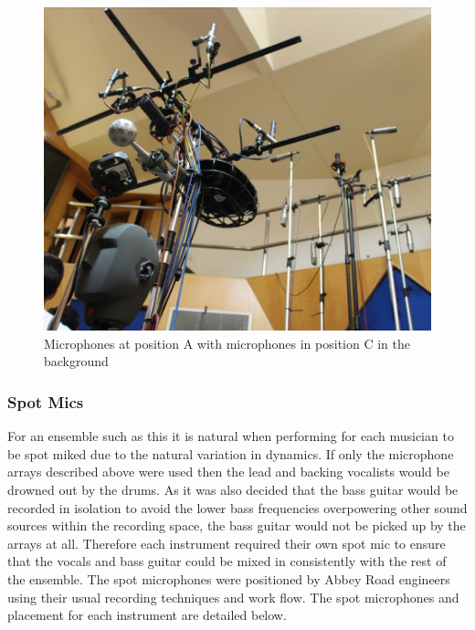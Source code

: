 			\begin{figure}[h]
			\begin{center}
				\includegraphics[width =\linewidth]{images/other/posAC.png}
				\caption{Microphones at position A with microphones in position C in the background}
				\label{AvsC}
			\end{center}
			\end{figure}

		\subsubsection{Spot Mics}

			For an ensemble such as this it is natural when performing for each musician to be spot miked due to the natural variation in dynamics. If only the microphone arrays described above were used then the lead and backing vocalists would be drowned out by the drums. As it was also decided that the bass guitar would be recorded in isolation to avoid the lower bass frequencies overpowering other sound sources within the recording space, the bass guitar would not be picked up by the arrays at all. Therefore each instrument required their own spot mic to ensure that the vocals and bass guitar could be mixed in consistently with the rest of the ensemble. The spot microphones were positioned by Abbey Road engineers using their usual recording techniques and work flow. The spot microphones and placement for each instrument are detailed below.\\
			
